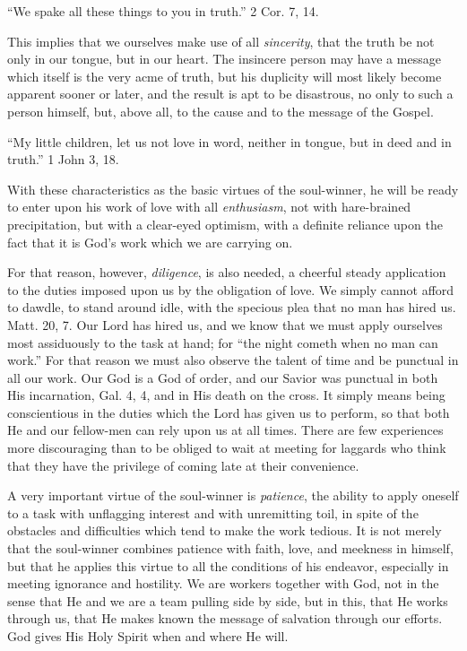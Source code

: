\documentclass[
]{book}
\begin{document}
``We spake all these things to you in truth.'' 2 Cor. 7, 14.

This implies that we ourselves make use of all \emph{sincerity}, that the truth be not only in our tongue, but in our heart. The insincere person may have a message which itself is the very acme of truth, but his duplicity will most likely become apparent sooner or later, and the result is apt to be disastrous, no only to such a person himself, but, above all, to the cause and to the message of the Gospel.

``My little children, let us not love in word, neither in tongue, but in deed and in truth.'' 1 John 3, 18.

With these characteristics as the basic virtues of the soul-winner, he will be ready to enter upon his work of love with all \emph{enthusiasm}, not with hare-brained precipitation, but with a clear-eyed optimism, with a definite reliance upon the fact that it is God's work which we are carrying on.

For that reason, however, \emph{diligence}, is also needed, a cheerful steady application to the duties imposed upon us by the obligation of love. We simply cannot afford to dawdle, to stand around idle, with the specious plea that no man has hired us. Matt. 20, 7. Our Lord has hired us, and we know that we must apply ourselves most assiduously to the task at hand; for ``the night cometh when no man can work.'' For that reason we must also observe the talent of time and be punctual in all our work. Our God is a God of order, and our Savior was punctual in both His incarnation, Gal. 4, 4, and in His death on the cross. It simply means being conscientious in the duties which the Lord has given us to perform, so that both He and our fellow-men can rely upon us at all times. There are few experiences more discouraging than to be obliged to wait at meeting for laggards who think that they have the privilege of coming late at their convenience.

A very important virtue of the soul-winner is \emph{patience}, the ability to apply oneself to a task with unflagging interest and with unremitting toil, in spite of the obstacles and difficulties which tend to make the work tedious. It is not merely that the soul-winner combines patience with faith, love, and meekness in himself, but that he applies this virtue to all the conditions of his endeavor, especially in meeting ignorance and hostility. We are workers together with God, not in the sense that He and we are a team pulling side by side, but in this, that He works through us, that He makes known the message of salvation through our efforts. God gives His Holy Spirit when and where He will.
\end{document}
